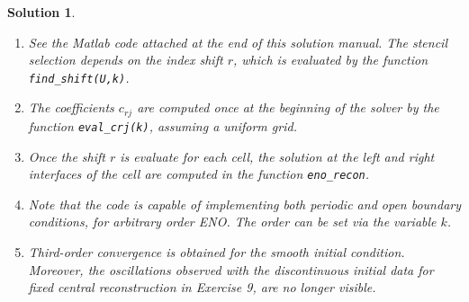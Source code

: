 \documentclass[10pt,letterpaper]{article}
\theoremstyle{break}
\newtheorem{mysolution}{Solution}
\newenvironment{solution}{\begin{mysolution}}{\end{mysolution}}
\begin{document}
\begin{solution}
	\begin{enumerate}
		\item
		See the Matlab code attached at the end of this solution manual. The stencil selection depends on the index shift $r$, which is evaluated by the function {\tt find\_shift(U,k)}.

		\item
		The coefficients $c_{rj}$ are computed once at the beginning of the solver by the function {\tt eval\_crj(k)}, assuming a uniform grid. 

		\item Once the shift $r$ is evaluate for each cell, the solution at the left and right interfaces of the cell are computed in the function {\tt eno\_recon}.

		\item Note that the code is capable of implementing both periodic and open boundary conditions, for arbitrary order ENO. The order can be set via the variable $k$.

		\item
		Third-order convergence is obtained for the smooth initial condition. Moreover, the oscillations observed with the discontinuous initial data for fixed central reconstruction in Exercise 9, are no longer visible.
	\end{enumerate}
\end{solution}
\end{document}
